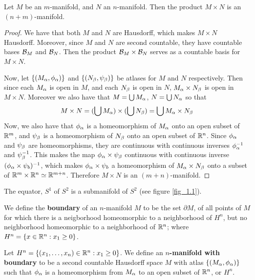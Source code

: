 \begin{lemma}\label{1.1.2}
    Let $M$ be an  $m$-manifold, and  $N$ an  $n$-manifold. Then the product $M
    \times N$ is an $(n+m)$-manifold.
\end{lemma}
\begin{proof}
    We have that both $M$ and  $N$ are Hausdorff, which makes  $M \times N$
    Hausdorff. Moreover, since  $M$ and  $N$ are second countable, they have
    countable bases  $\mathcal{B}_M$ and  $\mathcal{B}_N$. Then the product  $\mathcal{B}_M \times
    \mathcal{B}_N$ serves as a countable basis for  $M \times N$.

    Now, let  $\{(M_\alpha, \phi_\alpha)\}$ and $\{(N_\beta, \psi_\beta)\}$ be atlases for $M$
    and  $N$ respectively. Then since each $M_\alpha$ is open in  $M$, and each
    $N_\beta$ is open in  $N$,  $M_\alpha \times N_\beta$ is open in  $M \times N$.
    Moreover we also have that  $M=\bigcup{M_\alpha}$, $N=\bigcup{N_\alpha}$ so that
    \begin{equation*}
        M \times N=(\bigcup{M_\alpha}) \times (\bigcup{N_\beta})=\bigcup{M_\alpha\times
        N_\beta}
    \end{equation*}
    Now, we also have that $\phi_\alpha$ is a homeomorphism of  $M_\alpha$ onto an open
    subset of $\mathbb{R}^m$, and  $\psi_\beta$ is a homeomorphism of  $N_\beta$ onto an open
    subset of  $\mathbb{R}^n$. Since  $\phi_\alpha$ and  $\psi_\beta$ are homeomorphisms, they
    are continuous with continuous inverses  $\phi_\alpha^{-1}$ and
    $\psi_\beta^{-1}$. This makes the map $\phi_\alpha \times \psi_\beta$ continuous with
    continuous inverse $(\phi_\alpha \times \psi_b)^{-1}$, which makes $\phi_\alpha
    \times \psi_b$ a homeomorphism of $M_\alpha \times N_\beta$ onto a subset of $\mathbb{R}^m
    \times \mathbb{R}^n \simeq \mathbb{R}^{m+n}$. Therefore $M \times N$ is an
    $(m+n)$-manifold.
\end{proof}

\begin{example}\label{example_1.2}
    The equator, $S^1$ of  $S^2$ is a submanifold of  $S^2$  (see figure
    \ref{fig_1.1}).
\end{example}

\begin{definition}
    We define the \textbf{boundary} of an $n$-manifold $M$ to be the set
    $\partial{M}$, of all points of $M$ for which there is a neigborhood
    homeomorphic to a neighborhood of $H^n$, but no neighborhood homeomorphic to
    a neighborhood of $\mathbb{R}^n$; where $H^n=\{x \in \mathbb{R}^n : x_1 \geq 0\}$.
\end{definition}

\begin{definition}
    Let $H^n=\{(x_1, \dots, x_n) \in \mathbb{R}^n : x_1 \geq 0\}$. We define an
   \textbf{$n$-manifold with boundary}  to be a second countable Hausdorff space
   $M$ with atlas  $\{(M_\alpha,\phi_\alpha)\}$ such that $\phi_\alpha$ is a homeomorphism
   from  $M_\alpha$ to an open subset of  $\mathbb{R}^n$, or $H^n$.
\end{definition}

